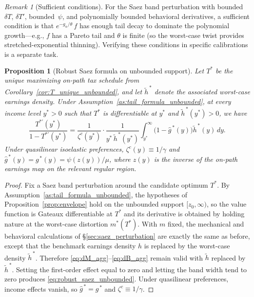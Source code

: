 \documentclass[12pt,a4paper]{article}
\theoremstyle{definition}
\theoremstyle{plain}
\newtheorem{proposition}{Proposition}[section]
\theoremstyle{remark}
\newtheorem{remark}{Remark}[section]
\newcommand{\zlow}{z_{\scriptscriptstyle 0}}
\begin{document}
\begin{remark}[Sufficient conditions]
\label{rem:sufficient_tail_unbounded}
For the Saez band perturbation with bounded $\delta T$,
$\delta T'$, bounded~$\psi$, and polynomially bounded
behavioral derivatives, a sufficient condition is that
$e^{-g_\alpha/\theta}\,f$ has enough tail decay to dominate
the polynomial growth---e.g., $f$ has a Pareto tail and
$\theta$ is finite (so the worst-case twist provides
stretched-exponential thinning).  Verifying these conditions
in specific calibrations is a separate task.
\end{remark}

\begin{proposition}[Robust Saez formula on unbounded support]
\label{prop:robust_saez_unbounded}
Let $T^*$ be the unique maximizing on-path tax schedule from
Corollary~\ref{cor:T_unique_unbounded}, and let
$\widetilde h^{\,*}$ denote the associated worst-case earnings
density.  Under Assumption~\ref{as:tail_formula_unbounded}, at every
income level $y^* > 0$ such that $T^*$ is differentiable at $y^*$ and
$\widetilde h^{\,*}(y^*) > 0$, we have
\begin{equation}
\label{eq:robust_saez_unbounded}
  \frac{T^{*\prime}(y^*)}{1-T^{*\prime}(y^*)}
  = \frac{1}{\zeta^c(y^*)}
    \cdot \frac{1}{y^*\,\widetilde h^{\,*}(y^*)}
    \int_{y^*}^{\infty}
    \bigl(1-\hat g^{\,*}(y)\bigr)
    \widetilde h^{\,*}(y)\,dy.
\end{equation}
Under quasilinear isoelastic preferences,
$\zeta^c(y) \equiv 1/\gamma$ and
$\hat g^{\,*}(y) = g^{\,*}(y) = \psi(z(y))/\mu$,
where $z(y)$ is the inverse of the on-path earnings map on
the relevant regular region.
\end{proposition}

\begin{proof}
Fix a Saez band perturbation around the candidate optimum $T^*$.  By
Assumption~\ref{as:tail_formula_unbounded}, the hypotheses of
Proposition~\ref{prop:envelope} hold on the unbounded support
$[\zlow,\infty)$, so the value function is Gateaux differentiable at
$T^*$ and its derivative is obtained by holding nature at the
worst-case distortion $m^*(T^*)$.  With $m$ fixed, the mechanical and
behavioral calculations of \S\ref{sec:saez_perturbation} are exactly
the same as before, except that the benchmark earnings density $h$ is
replaced by the worst-case density $\widetilde h^{\,*}$.  Therefore
\eqref{eq:dM_agg}--\eqref{eq:dB_agg} remain valid with
$\widetilde h$ replaced by $\widetilde h^{\,*}$.  Setting the first-order
effect equal to zero and letting the band width tend to zero
produces \eqref{eq:robust_saez_unbounded}.  Under quasilinear
preferences, income effects vanish, so
$\hat g^{\,*} = g^{\,*}$ and
$\zeta^c \equiv 1/\gamma$.
\end{proof}
\end{document}

